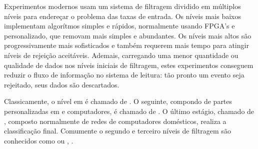 Experimentos modernos usam um sistema de filtragem dividido em múltiplos
níveis para endereçar o problema das taxas de entrada. Os níveis mais baixos
implementam algorítmos simples e rápidos, normalmente usando FPGA's e
 personalizado, que removam  mais simples e
abundantes. Os níveis mais altos são progressivamente mais sofisticados e
também requerem mais tempo para atingir níveis de rejeição
aceitáveis. Ademais, carregando uma menor quantidade ou qualidade de dados nos
níveis iniciais de filtragem, estes experimentos conseguem reduzir o fluxo de
informação no sistema de leitura: tão pronto um evento seja rejeitado, seus
dados são descartados.

Classicamente, o nível em  é chamado de . O
seguinte, compondo de partes personalizadas em  e computadores,
é chamado de . O último estágio, chamado de
, composto normalmente de redes de computadores
domésticos, realiza a classificação final. Comumente o segundo e terceiro
níveis de filtragem são conhecidos como  ou
, .
